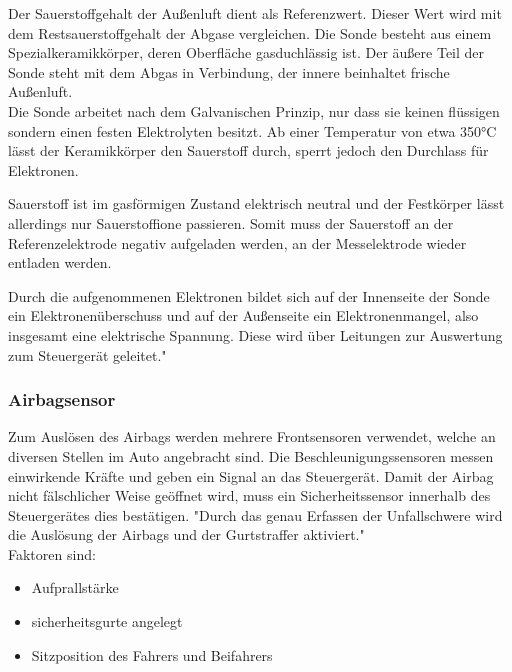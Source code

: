 \documentclass{article}
\begin{document}
				\begin{flushleft}
					Der Sauerstoffgehalt der Außenluft dient als Referenzwert. Dieser Wert wird mit dem Restsauerstoffgehalt der Abgase vergleichen. Die Sonde besteht aus einem Spezialkeramikkörper, deren Oberfläche gasduchlässig ist. Der äußere Teil der Sonde steht mit dem Abgas in Verbindung, der innere beinhaltet frische Außenluft.\\
					Die Sonde arbeitet nach dem Galvanischen Prinzip, nur dass sie keinen flüssigen sondern einen festen Elektrolyten besitzt. Ab einer Temperatur von etwa 350°C lässt der Keramikkörper den Sauerstoff durch, sperrt jedoch den Durchlass für Elektronen.
					
					Sauerstoff ist im gasförmigen Zustand elektrisch neutral und der Festkörper lässt allerdings nur Sauerstoffione passieren. Somit muss der Sauerstoff an der Referenzelektrode negativ aufgeladen werden, an der Messelektrode wieder entladen werden.
					
					Durch die aufgenommenen Elektronen bildet sich auf der Innenseite der Sonde ein Elektronenüberschuss und auf der Außenseite ein Elektronenmangel, also insgesamt eine elektrische Spannung. Diese wird über Leitungen zur Auswertung zum Steuergerät geleitet."\cite{TS31}
				\end{flushleft}
			
			\subsubsection{Airbagsensor}
					Zum Auslösen des Airbags werden mehrere Frontsensoren verwendet, welche an diversen Stellen im Auto angebracht sind. Die Beschleunigungssensoren messen einwirkende Kräfte und geben ein Signal an das Steuergerät. Damit der Airbag nicht fälschlicher Weise geöffnet wird, muss ein Sicherheitssensor innerhalb des Steuergerätes dies bestätigen. "Durch das genau Erfassen der Unfallschwere wird die Auslösung der Airbags und der Gurtstraffer aktiviert."\cite{TS32}\\
					Faktoren sind: 
					
					\begin{itemize}
						\item Aufprallstärke
						\item sicherheitsgurte angelegt
						\item Sitzposition des Fahrers und Beifahrers
					\end{itemize}
				
				
\end{document}

